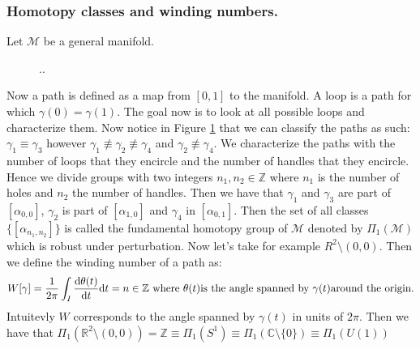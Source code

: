 \documentclass[10pt,a4paper]{book}
\begin{document}
\subsubsection{Homotopy classes and winding numbers.}
Let $\mathcal{M}$ be a general manifold.
\begin{figure}\label{homotopy}
\centering
{}
\caption{..}
\end{figure}
Now a path is defined as a map from $[0,1]$ to the manifold. A loop is a path for which $\gamma(0) = \gamma(1)$. The goal now is to look at all possible loops and characterize them. Now notice in Figure \ref{homotopy} that we can classify the paths as such: $\gamma_1 \equiv \gamma_3$ however $\gamma_1 \not\equiv \gamma_2 \not\equiv \gamma_4$ and $\gamma_2 \not \equiv \gamma_4$. We characterize the paths with the number of loops that they encircle and the number of handles that they encircle. Hence we divide groups with two integers $n_1, n_2 \in \mathbb{Z}$ where $n_1$ is the number of holes and $n_2$ the number of handles. Then we have that $\gamma_1$ and $\gamma_3$ are part of $[\alpha_{0, 0}]$, $\gamma_2$ is part of $[\alpha_{1, 0}]$ and $\gamma_4$ in $[\alpha_{0,1}]$. Then the set of all classes $\{[\alpha_{n_1, n_2}]\}$ is called the fundamental homotopy group of $\mathcal{M}$ denoted by $\Pi_1(\mathcal{M})$ which is robust under perturbation. Now let's take for example $R^2\setminus (0, 0)$. Then we define the winding number of a path as:
\[
W[\gamma] = \frac{1}{2\pi} \int_I \dv{\theta(t)}{t} \dd t = n \in \mathbb{Z} \text{ where } \theta(t) \text{is the angle spanned by } \gamma(t) \text{around the origin.}
\]
Intuitevly $W$ corresponds to the angle spanned by $\gamma(t)$ in units of $2\pi$. Then we have that $\Pi_1(\mathbb{R}^2 \setminus (0, 0)) = \mathbb{Z} \equiv \Pi_1(S^1) \equiv \Pi_1(\mathbb{C} \setminus \{0\}) \equiv \Pi_1(U(1))$
\begin{figure}
\centering
{}
\end{figure}
\end{document}
